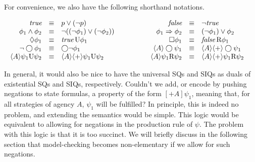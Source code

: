 For convenience, we also have the following shorthand notations.
\begin{center}
$\begin{array}{rclcrcl}
\true
& \equiv & p\vee(\neg p) 
& \hspace*{10mm} & %
\false
& \equiv & \neg\true \\
\phi_1\wedge \phi_2
& \equiv & \neg((\neg\phi_1)\vee(\neg\phi_2)) 
& \hspace*{10mm} & %
\phi_1\Rightarrow \phi_2
& \equiv & (\neg \phi_1)\vee \phi_2 \\
\pevt \phi_1
& \equiv & \true\,\until \phi_1 
& \hspace*{10mm} & %
\pfrr \phi_1
& \equiv & \false\,\rmrel \phi_1 \\
\neg\nxt \phi_1
& \equiv & \nxt\neg\phi_1 
& \hspace*{10mm} & %
\; \langle A\rangle \nxt\psi_1 
& \equiv & \langle A\rangle \langle+\rangle\nxt\psi_1 \\
\; \langle A\rangle \psi_1\until\psi_2
& \equiv & \langle A\rangle\langle+\rangle \psi_1\until\psi_2 
& \hspace*{10mm} & %
\; \langle A\rangle \psi_1\rmrel\psi_2  
& \equiv & \langle A\rangle \langle+\rangle\psi_1 \rmrel\psi_2 \\
\end{array}
$
\end{center} 
In general, it would also be nice to have the universal SQs and 
SIQs as duals of existential SQs and SIQs, respectively. 
Couldn't we add, or encode by pushing negations to state formulas, 
a property of the form $[+A]\psi_1$, meaning that, for all strategies of agency $A$,  $\psi_1$ will be fulfilled? 
In principle, this is indeed no problem, and extending the semantics would be simple.
This logic would be equivalent to allowing for negations in the production rule of $\psi$.
The problem with this logic is that it is too succinct.
We will briefly discuss in the following section that model-checking becomes non-elementary if we allow for such negations.

